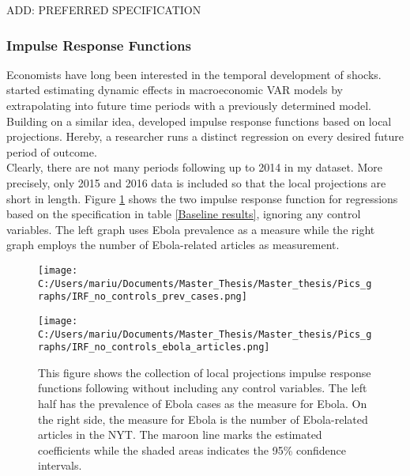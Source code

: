 \documentclass{article}
\begin{document}
ADD: PREFERRED SPECIFICATION


\subsubsection{Impulse Response Functions}

Economists have long been interested in the temporal development of shocks. \cite{blanchard1988dynamic} started estimating dynamic effects in
macroeconomic VAR models by extrapolating into future time periods with a previously determined model. Building on a similar idea, \cite{jorda2005estimation} developed impulse response functions based on local projections. Hereby, a researcher runs a distinct regression on every desired future period of outcome. \\
Clearly, there are not many periods following up to 2014 in my dataset. More precisely, only 2015 and 2016 data is included so that the local projections are short in length. Figure \ref{First Stage IRF - no controls} shows the two impulse response function for regressions based on the specification in table \ref{Baseline results}, ignoring any control variables. The left graph uses Ebola prevalence as a measure while the right graph employs the number of Ebola-related articles as measurement.

\begin{figure}[!ht] 
\begin{minipage}[t]{0.5\linewidth}\vspace{0pt} 
\texttt{[image: C:/Users/mariu/Documents/Master\_Thesis/Master\_thesis/Pics\_graphs/IRF\_no\_controls\_prev\_cases.png]}\\
\end{minipage}\hfill%
\begin{minipage}[t]{0.5\linewidth}\vspace{0pt} 
\texttt{[image: C:/Users/mariu/Documents/Master\_Thesis/Master\_thesis/Pics\_graphs/IRF\_no\_controls\_ebola\_articles.png]}\\
\end{minipage}\hfill%
\caption{This figure shows the collection of local projections impulse response functions following \cite{jorda2005estimation} without including any control variables. The left half has the prevalence of Ebola cases as the measure for Ebola. On the right side, the measure for Ebola is the number of Ebola-related articles in the NYT. The maroon line marks the estimated coefficients while the shaded areas indicates the 95\% confidence intervals.}
\label{First Stage IRF - no controls}
\end{figure}
\end{document}
